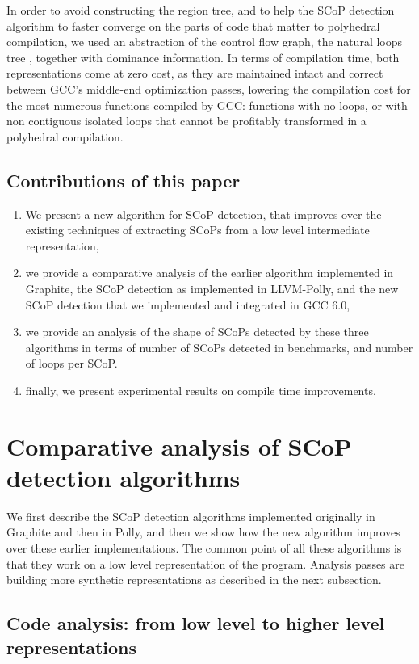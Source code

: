 \documentclass{sigplanconf}
\begin{document}
In order to avoid constructing the region tree, and to help the SCoP detection
algorithm to faster converge on the parts of code that matter to polyhedral
compilation, we used an abstraction of the control flow graph, the natural loops
tree \cite{dragonbook}, together with dominance information.  In terms of
compilation time, both representations come at zero cost, as they are maintained
intact and correct between GCC's middle-end optimization passes, lowering the
compilation cost for the most numerous functions compiled by GCC: functions with
no loops, or with non contiguous isolated loops that cannot be profitably
transformed in a polyhedral compilation.

\subsection{Contributions of this paper}
\begin{enumerate}
  \item We present a new algorithm for SCoP detection, that improves over the
    existing techniques of extracting SCoPs from a low level intermediate
    representation,
  \item we provide a comparative analysis of the earlier algorithm implemented
    in Graphite, the SCoP detection as implemented in LLVM-Polly, and the new
    SCoP detection that we implemented and integrated in GCC 6.0,
  \item we provide an analysis of the shape of SCoPs detected by these three
    algorithms in terms of number of SCoPs detected in benchmarks, and number of
    loops per SCoP.
  \item finally, we present experimental results on compile time improvements.
\end{enumerate}

\section{Comparative analysis of SCoP detection algorithms}

We first describe the SCoP detection algorithms implemented originally in
Graphite and then in Polly, and then we show how the new algorithm improves over
these earlier implementations.  The common point of all these algorithms is that
they work on a low level representation of the program.  Analysis passes are
building more synthetic representations as described in the next subsection.

\subsection{Code analysis: from low level to higher level representations}
\end{document}
